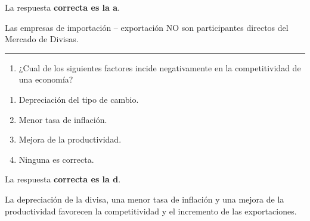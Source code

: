 \documentclass[
  letterpaper,
  DIV=11,
  numbers=noendperiod]{scrreprt}
\providecommand{\tightlist}{%
  \setlength{\itemsep}{0pt}\setlength{\parskip}{0pt}}\usepackage{longtable,booktabs,array}
\begin{document}
\begin{tcolorbox}[enhanced jigsaw, left=2mm, opacityback=0, colback=white, breakable, arc=.35mm, bottomrule=.15mm, rightrule=.15mm, toprule=.15mm, leftrule=.75mm, colframe=quarto-callout-tip-color-frame]
\begin{minipage}[t]{5.5mm}
\textcolor{quarto-callout-tip-color}{\faLightbulb}
\end{minipage}%
\begin{minipage}[t]{\textwidth - 5.5mm}

La respuesta \textbf{correcta es la a}.

Las empresas de importación -- exportación NO son participantes directos
del Mercado de Divisas.

\end{minipage}%
\end{tcolorbox}

\begin{center}\rule{0.5\linewidth}{0.5pt}\end{center}

\begin{enumerate}
\def\labelenumi{\arabic{enumi}.}
\setcounter{enumi}{37}
\tightlist
\item
  ¿Cual de los siguientes factores incide negativamente en la
  competitividad de una economía?
\end{enumerate}

\begin{enumerate}
\def\labelenumi{\alph{enumi}.}
\item
  Depreciación del tipo de cambio.
\item
  Menor tasa de inflación.
\item
  Mejora de la productividad.
\item
  Ninguna es correcta.
\end{enumerate}

\begin{tcolorbox}[enhanced jigsaw, left=2mm, opacityback=0, colback=white, breakable, arc=.35mm, bottomrule=.15mm, rightrule=.15mm, toprule=.15mm, leftrule=.75mm, colframe=quarto-callout-tip-color-frame]
\begin{minipage}[t]{5.5mm}
\textcolor{quarto-callout-tip-color}{\faLightbulb}
\end{minipage}%
\begin{minipage}[t]{\textwidth - 5.5mm}

La respuesta \textbf{correcta es la d}.

La depreciación de la divisa, una menor tasa de inflación y una mejora
de la productividad favorecen la competitividad y el incremento de las
exportaciones.

\end{minipage}%
\end{tcolorbox}
\end{document}
